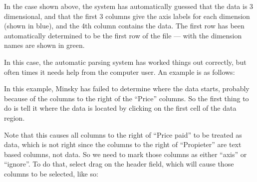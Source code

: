 In the case shown above, the system has automatically guessed that the
data is 3 dimensional, and that the first 3 columns give the axis
labels for each dimension (shown in blue), and the 4th column contains
the data. The first row has been automatically determined to be the
first row of the file --- with the dimension names are shown in green.

In this case, the automatic parsing system has worked things out
correctly, but often times it needs help from the computer user. An
example is as follows:

\begin{center}
\end{center}

In this example, Minsky has failed to determine where the data starts,
probably because of the columns to the right of the ``Price''
columns. So the first thing to do is tell it where the data is located
by clicking on the first cell of the data region.

\begin{center}
\end{center}

Note that this causes all columns to the right of ``Price paid'' to be
treated as data, which is not right since the columns to the right of
``Propieter'' are text based columns, not data. So we need to mark
those columns as either ``axis'' or ``ignore''. To do that, select
drag on the header field, which will cause those columns to be
selected, like so:

